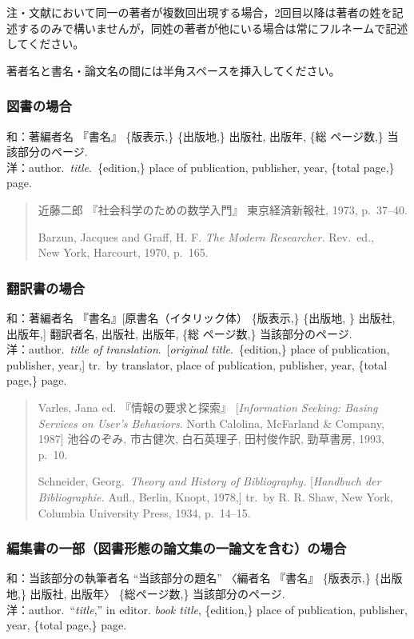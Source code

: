 \documentclass[b5paper,10pt,twocolumn,tombow]{jarticle}
\begin{document}
注・文献において同一の著者が複数回出現する場合，2回目以降は著者の姓を記述するのみで構いませんが，同姓の著者が他にいる場合は常にフルネームで記述してください。

著者名と書名・論文名の間には半角スペースを挿入してください。

\subsubsection{図書の場合}
\noindent{}和：著編者名 『書名』 \{版表示,\} \{出版地,\} 出版社, 出版年, \{総
\bigskip
ページ数,\} 当該部分のページ.\\
洋：author.\ \textit{title}.\ \{edition,\} place of publication,
publisher, year, \{total page,\} page.
\begin{quote}
  近藤二郎 『社会科学のための数学入門』 東京経済新報社, 1973,
  p.~37--40.

  Barzun, Jacques and Graff, H. F. \textit{The Modern Researcher.}
  Rev.\ ed., \\New York, Harcourt, 1970, p.~165.
\end{quote}


\subsubsection{翻訳書の場合}
\noindent{}和：著編者名 『書名』[原書名（イタリック体） \{版表示,\}
\{出版地, \} 出版社, 出版年,] 翻訳者名, 出版社, 出版年, \{総
\bigskip
ページ数,\} 当該部分のページ.\\
洋：author.\ \textit{title of translation}.\ [\textit{original
title}.\ \{edition,\} place of publication, publisher, year,] tr.\ by
translator, place of publication, publisher, year, \{total page,\} page.

\begin{quote}
  Varles, Jana ed. 『情報の要求と探索』 [\textit{Information Seeking:
  Basing Services on User's Behaviors.} North Calolina,
  McFarland \& Company, 1987] 池谷のぞみ, 市古健次, 白石英理子, 田村俊作訳,
  勁草書房, 1993, p.~10.

  Schneider, Georg.\ \textit{Theory and History of Bibliography.}
  [\textit{Handbuch der Bibliographie.} Aufl., Berlin, Knopt, 1978,]
  tr.\ by R. R. Shaw, New York, Columbia University Press, 1934, p.~14--15.
\end{quote}

\subsubsection{編集書の一部（図書形態の論文集の一論文を含む）の場合}
\noindent{}和：当該部分の執筆者名 ``当該部分の題名'' 〈編者名 『書名』 \{版表示,\} \{出版地,\} 出版社, 出版年〉 \{総ページ数,\} 当該部分のページ. \bigskip \\
洋：author.\ ``\textit{title},'' in editor. \textit{book title}, \{edition,\} place of publication,
publisher, year, \{total page,\} page.
\end{document}
